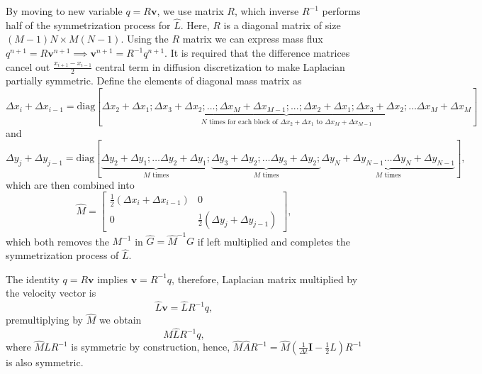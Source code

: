 \documentclass{article}
\numberwithin{equation}{section}
\begin{document}
By moving to new variable ${q} = R\boldsymbol{v}$, we use matrix $R$, which inverse $R^{-1}$ performs half of the symmetrization process for $\hat{L}$. 
Here, $R$ is a diagonal matrix of size $(M-1)N\times M(N-1)$.  Using the $R$ matrix we can express mass flux $q^{n+1}=R\boldsymbol{v}^{n+1}\implies \boldsymbol{v}^{n+1}=R^{-1}q^{n+1}$. It is required that the difference matrices cancel out $\frac{x_{i+1}-x_{i-1}}{2}$ central term in diffusion discretization to make Laplacian partially symmetric. Define the elements of diagonal mass matrix as
\begin{equation*}
{\Delta x_i+\Delta x_{i-1}} = \text{diag}[\underbrace{\Delta x_2+\Delta x_1; \Delta x_3+\Delta x_2; \dotsc ;\Delta x_{M}+\Delta x_{M-1}; ...;\Delta x_2+\Delta x_1; \Delta x_3+\Delta x_2; \dotsc \Delta x_{M}+\Delta x_{M}}_{N\text{ times for each block of } \Delta x_2+\Delta x_1\text{ to }\Delta x_{M}+\Delta x_{M-1}}]
\end{equation*}
and
\begin{equation*}
{\Delta y_j+\Delta y_{j-1}} = \text{diag}[\underbrace{\Delta y_2+\Delta y_1;  \dotsc \Delta y_2+\Delta y_1;}_{M\text{ times}} \underbrace{\Delta y_3+\Delta y_2; \dotsc \Delta y_3+\Delta y_2;}_{M\text{ times}} \underbrace{\Delta y_N+\Delta y_{N-1}\dotsc \Delta y_N+\Delta y_{N-1}}_{M\text{ times}}],	
\end{equation*}
which are then combined into
\begin{equation*}
\hat{M} =\left[\begin{array}{cc}
\frac{1}{2}\left(\Delta x_i+\Delta x_{i-1}\right) & 0 \\
0 & \frac{1}{2}\left(\Delta y_j+\Delta y_{j-1}\right)
\end{array}\right],
\end{equation*}
which both removes the $M^{-1}$ in $\hat{G}=\hat{M}^{-1}G$ if left multiplied and completes the symmetrization process of $\hat{L}$.

The identity ${q}=R\boldsymbol{v}$ implies $\boldsymbol{v}=R^{-1}{q}$, therefore, Laplacian matrix multiplied by the velocity vector is
$$\hat{L}\boldsymbol{v}= \hat{L}R^{-1}{q},$$ 
premultiplying by $\hat M$ we obtain
$$\hat M\hat{L}R^{-1}{q},$$ 
where $\hat M L R^{-1}$ is symmetric by construction, hence, $\hat M\hat{A}R^{-1}=\hat M (\frac{1}{\Delta t}\mathbf{I}-\frac{1}{2}L) R^{-1}$ is also symmetric.  
\end{document}
